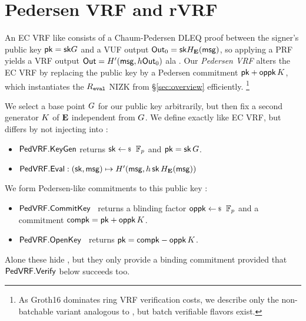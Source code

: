 \section{Pedersen VRF and rVRF}
\label{sec:pederson_vrf}


An EC VRF like \cite{nsec5,VXEd25519,draft-irtf-cfrg-vrf-10} consists
of a Chaum-Pedersen DLEQ proof between the signer's public key
$\mathsf{pk} = \mathsf{sk} G$ and a VUF output ${\mathsf{Out}}_0 = \mathsf{sk} H_{{\mathbf{E}}}(\mathsf{msg})$,
so applying a PRF yields a VRF output
 ${\mathsf{Out}} = H'(\mathsf{msg}, h {\mathsf{Out}}_0)$ ala \cite[Proposition 1]{vrf_micali}.
%
Our {\em Pedersen VRF} \PedVRF alters the EC VRF by replacing the
public key by a Pedersen commitment $\mathsf{pk} + \mathsf{oppk} \, K$, which
instantiates the $R_{\mathtt{eval}}$ NIZK from \S\ref{sec:overview} efficiently.
\footnote{As Groth16 dominates ring VRF verification costs,
we describe only the non-batchable variant analogous to
\cite{nsec5,VXEd25519,draft-irtf-cfrg-vrf-10}, but
 batch verifiable flavors exist.}


We select a base point $G$ for our public key arbitrarily, %
but then fix a second generator $K$ of ${\mathbf{E}}$ independent from $G$.
%
We define \KeyGen exactly like EC VRF, but
 \Eval differs by not injecting \pk into \msg:
\begin{itemize}
\item ${\mathsf{PedVRF}}.{\mathsf{KeyGen}}$ \quad returns $\sk \leftsample \F_p$ and $\mathsf{pk} = \mathsf{sk} \, G$.
\item ${\mathsf{PedVRF}}.{\mathsf{Eval}} : (\mathsf{sk},\mathsf{msg}) \mapsto H'(\mathsf{msg}, h \, \mathsf{sk} \, H_{{\mathbf{E}}}(\mathsf{msg}))$
\end{itemize}

\noindent We form Pedersen-like commitments to this public key \pk:
\begin{itemize}
\item ${\mathsf{PedVRF}}.{\mathsf{CommitKey}}$ \,
returns a blinding factor $\openpk \leftsample \F_p$
and a commitment $\mathsf{compk} = \mathsf{pk} + \mathsf{oppk} \, K$.
\item ${\mathsf{PedVRF}}.{\mathsf{OpenKey}}$ \,
returns $\mathsf{pk} = \mathsf{compk} - \mathsf{oppk} \, K$.
\end{itemize}
Alone these hide \pk, but they only provide a binding commitment
provided that ${\mathsf{PedVRF}}.{\mathsf{Verify}}$ below succeeds too.

